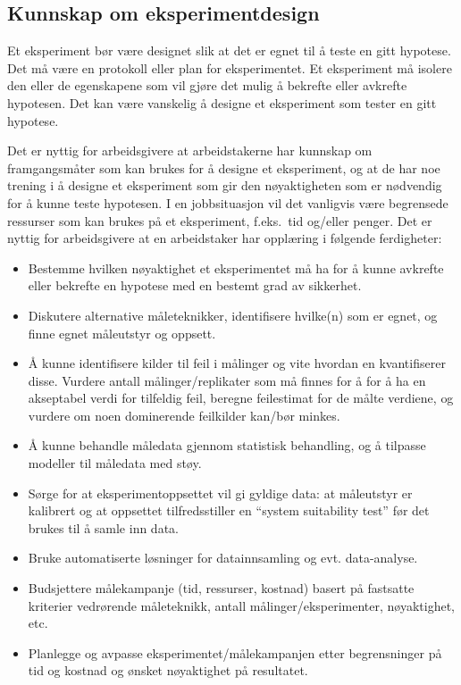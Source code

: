 \documentclass{article}
\begin{document}
\subsection{Kunnskap om eksperimentdesign}
Et eksperiment bør være designet slik at det er egnet til å teste en gitt hypotese.
Det må være en protokoll eller plan for eksperimentet.
Et eksperiment må isolere den eller de egenskapene som vil gjøre det mulig å bekrefte eller avkrefte hypotesen.
Det kan være vanskelig å designe et eksperiment som tester en gitt hypotese.

Det er nyttig for arbeidsgivere at arbeidstakerne har kunnskap om framgangsmåter som kan brukes for å designe et eksperiment, og at de har noe trening i å designe et eksperiment som gir den nøyaktigheten som er nødvendig for å kunne teste hypotesen. I en jobbsituasjon vil det vanligvis være begrensede ressurser som kan brukes på et eksperiment, f.eks.~tid og/eller penger.
Det er nyttig for arbeidsgivere at en arbeidstaker har opplæring i følgende ferdigheter:
\begin{itemize}
  \item Bestemme hvilken nøyaktighet et eksperimentet må ha for å kunne avkrefte eller bekrefte en hypotese med en bestemt grad av sikkerhet.
  \item Diskutere alternative måleteknikker, identifisere hvilke(n) som er egnet, og finne egnet måleutstyr og oppsett.
  \item Å kunne identifisere kilder til feil i målinger og vite hvordan en kvantifiserer disse. Vurdere antall målinger/replikater som må finnes for å for å ha en akseptabel verdi for tilfeldig feil, beregne feilestimat for de målte verdiene, og vurdere om noen dominerende feilkilder kan/bør minkes.
  \item Å kunne behandle måledata gjennom statistisk behandling, og å tilpasse modeller til måledata med støy.
  \item Sørge for at eksperimentoppsettet vil gi gyldige data: at måleutstyr er kalibrert og at oppsettet tilfredsstiller en ``system suitability test'' før det brukes til å samle inn data.
  \item Bruke automatiserte løsninger for datainnsamling og evt. data-analyse.
  \item Budsjettere målekampanje (tid, ressurser, kostnad) basert på fastsatte kriterier vedrørende måleteknikk, antall målinger/eksperimenter, nøyaktighet, etc.
  \item Planlegge og avpasse eksperimentet/målekampanjen etter begrensninger på tid og kostnad og ønsket nøyaktighet på resultatet.
\end{itemize}
\end{document}
